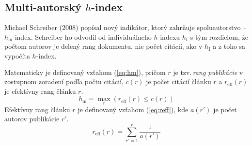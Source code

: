 \subsection{Multi-autorský $h$-index}

Michael Schreiber (2008) popísal nový indikátor, ktorý zahrňuje spoluautorstvo
-- $h_{\mathrm{m}}$-index.  Schreiber ho odvodil od individuálneho $h$-indexu
$h_{\mathrm{I}}$ s tým rozdielom, že počtom autorov je delený rang dokumentu,
nie počet citácií, ako v $h_{\mathrm{I}}$ a z toho sa vypočíta $h$-index.

Matematicky je definovaný vzťahom (\ref{eq:hm}), pričom $r$ je tzv.\,\emph{rang
  publikácie} v zostupnom zoradení podľa počtu citácií, $c(r)$ je počet citácií
článku $r$ a $r_{\mathrm{eff}}(r)$ je efektívny rang článku $r$.
\begin{equation}
\label{eq:hm}
h_{\mathrm{m}} = \max_r{(r_{\mathrm{eff}}(r) \leq c(r))}
\end{equation}
Efektívny rang článku $r$ je definovaný vzťahom (\ref{eq:reff}), kde $a(r')$ je
počet autorov publikácie $r'$.
\begin{equation}
\label{eq:reff}
r_{\mathrm{eff}}(r) = \sum_{r'=1}^r{\frac{1}{a(r')}}
\end{equation}


